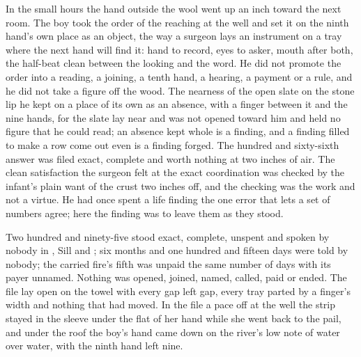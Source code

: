 \scenebreak

In the small hours the hand outside the wool went up an inch toward the next room. The boy took the order of the reaching at the well and set it on the ninth hand's own place as an object, the way a surgeon lays an instrument on a tray where the next hand will find it: hand to record, eyes to asker, mouth after both, the half-beat clean between the looking and the word. He did not promote the order into a reading, a joining, a tenth hand, a hearing, a payment or a rule, and he did not take a figure off the wood. The nearness of the open slate on the stone lip he kept on a place of its own as an absence, with a finger between it and the nine hands, for the slate lay near and was not opened toward him and held no figure that he could read; an absence kept whole is a finding, and a finding filled to make a row come out even is a finding forged. The hundred and sixty-sixth answer was filed exact, complete and worth nothing at two inches of air. The clean satisfaction the surgeon felt at the exact coordination was checked by the infant's plain want of the crust two inches off, and the checking was the work and not a virtue. He had once spent a life finding the one error that lets a set of numbers agree; here the finding was to leave them as they stood.

Two hundred and ninety-five stood exact, complete, unspent and spoken by nobody in , Sill and ; six months and one hundred and fifteen days were told by nobody; the carried fire's fifth was unpaid the same number of days with its payer unnamed. Nothing was opened, joined, named, called, paid or ended. The file lay open on the towel with every gap left gap, every tray parted by a finger's width and nothing that had moved. In the file a pace off at the well the strip stayed in the sleeve under the flat of her hand while she went back to the pail, and under the roof the boy's hand came down on the river's low note of water over water, with the ninth hand left nine.
